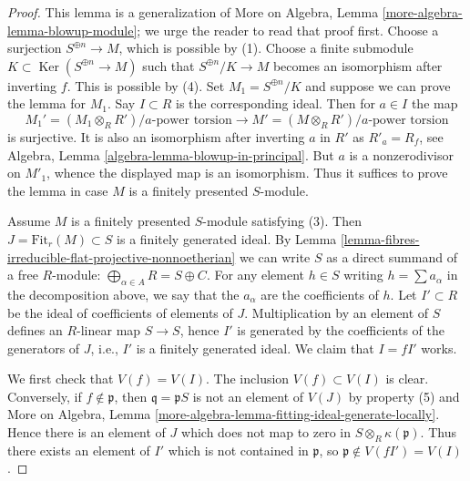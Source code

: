 \documentclass[10pt,a4paper]{amsart}
\theoremstyle{plain}
\theoremstyle{definition}
\theoremstyle{remark}
\numberwithin{equation}{subsection}
\def\Ker{\mathop{\mathrm{Ker}}}
\begin{document}
\begin{proof}
This lemma is a generalization of
More on Algebra, Lemma \ref{more-algebra-lemma-blowup-module};
we urge the reader to read that proof first.
Choose a surjection $S^{\oplus n} \to M$, which is possible by (1).
Choose a finite submodule $K \subset \Ker(S^{\oplus n} \to M)$
such that $S^{\oplus n}/K \to M$ becomes an isomorphism after inverting $f$.
This is possible by (4). Set $M_1 = S^{\oplus n}/K$ and suppose we can
prove the lemma for $M_1$. Say $I \subset R$ is the corresponding ideal.
Then for $a \in I$ the map
$$
M_1' = (M_1 \otimes_R R')/a\text{-power torsion}
\longrightarrow
M' = (M \otimes_R R')/a\text{-power torsion}
$$
is surjective. It is also an isomorphism after inverting $a$ in $R'$
as $R'_a = R_f$, see Algebra, Lemma \ref{algebra-lemma-blowup-in-principal}.
But $a$ is a nonzerodivisor on $M'_1$, whence the displayed map is an
isomorphism. Thus it suffices to prove the lemma in case $M$ is a finitely
presented $S$-module.

\medskip\noindent
Assume $M$ is a finitely presented $S$-module satisfying (3).
Then $J = \text{Fit}_r(M) \subset S$ is a finitely generated ideal.
By Lemma \ref{lemma-fibres-irreducible-flat-projective-nonnoetherian}
we can write $S$ as a direct summand of a free
$R$-module: $\bigoplus_{\alpha \in A} R = S \oplus C$.
For any element $h \in S$ writing $h = \sum a_\alpha$ in the
decomposition above, we say that the $a_\alpha$ are the coefficients of $h$.
Let $I' \subset R$ be the ideal of coefficients
of elements of $J$. Multiplication by an element of $S$ defines
an $R$-linear map $S \to S$, hence $I'$ is generated by the coefficients
of the generators of $J$, i.e., $I'$ is a finitely generated ideal.
We claim that $I = fI'$ works.

\medskip\noindent
We first check that $V(f) = V(I)$. The inclusion $V(f) \subset V(I)$ is
clear. Conversely, if $f \not \in \mathfrak p$, then
$\mathfrak q =  \mathfrak p S$ is not an element of $V(J)$ by
property (5) and More on Algebra, Lemma
\ref{more-algebra-lemma-fitting-ideal-generate-locally}.
Hence there is an
element of $J$ which does not map to zero in $S \otimes_R \kappa(\mathfrak p)$.
Thus there exists an element of $I'$ which is not contained in
$\mathfrak p$, so $\mathfrak p \not \in V(fI') = V(I)$.


\end{proof}
\end{document}
